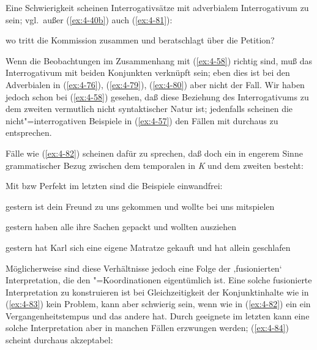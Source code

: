 \documentclass[output=paper]{langsci/langscibook}
\begin{document}
Eine Schwierigkeit scheinen Interrogativsätze mit adverbialem Interrogativum zu sein; vgl.\ außer (\ref{ex:4-40b}) auch (\ref{ex:4-81}):

\begin{exe}
\ex%
\label{ex:4-81}
wo tritt die Kommission zusammen und beratschlagt über die Petition?
\end{exe}
Wenn die Beobachtungen im Zusammenhang mit (\ref{ex:4-58}) richtig sind, muß das Interrogativum mit beiden Konjunkten verknüpft sein; eben dies ist bei den Adverbialen in (\ref{ex:4-76}), (\ref{ex:4-79}), (\ref{ex:4-80}) aber nicht der Fall. Wir haben jedoch schon bei (\ref{ex:4-58}) gesehen, daß diese Beziehung des Interrogativums zu dem zweiten  vermutlich nicht syntaktischer Natur ist; jedenfalls scheinen die nicht"=interrogativen Beispiele in (\ref{ex:4-57}) den Fällen mit  durchaus zu entsprechen.

Fälle wie (\ref{ex:4-82}) scheinen dafür zu sprechen, daß doch ein in engerem Sinne grammatischer Bezug zwischen dem temporalen  in \textit{K} und dem zweiten  besteht:


\begin{exe}
\ex
\label{ex:4-82}
\begin{xlist}


\end{xlist}
\end{exe}
Mit  bzw Perfekt im letzten  sind die Beispiele einwandfrei:

\begin{exe}
\ex
\label{ex:4-83}
\begin{xlist}
\ex%
\label{ex:4-83a}
gestern ist dein Freund zu uns gekommen und wollte bei uns mitspielen

\ex%
\label{ex:4-83b}
gestern haben alle ihre Sachen gepackt und wollten ausziehen

\ex%
\label{ex:4-83c}
gestern hat Karl sich eine eigene Matratze gekauft und hat allein geschlafen
\end{xlist}
\end{exe}
Möglicherweise sind diese Verhältnisse jedoch eine Folge der ‚fusionierten‘ Interpretation, die den "=Koordinationen eigentümlich ist. Eine solche fusionierte Interpretation zu konstruieren ist bei Gleichzeitigkeit der Konjunktinhalte wie in (\ref{ex:4-83}) kein Problem, kann aber schwierig sein, wenn wie in (\ref{ex:4-82}) ein  ein Vergangenheitstempus und das andere  hat. Durch geeignete  im letzten  kann eine solche Interpretation aber in manchen Fällen erzwungen werden; (\ref{ex:4-84}) scheint durchaus akzeptabel:
\end{document}
